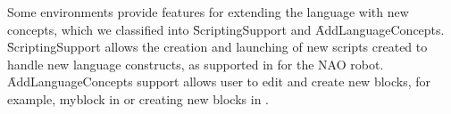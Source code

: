 





Some environments provide features for extending the language with new concepts, which we classified into \f{ScriptingSupport} and \f{AddLanguageConcepts}. %
\f{ScriptingSupport} allows the creation and launching of new scripts created to handle new language constructs, as supported in \choregraphe for the NAO robot. \f{AddLanguageConcepts} support allows user to edit and create new blocks, for example, myblock in \makeblock or creating new blocks in \tivipe. 


